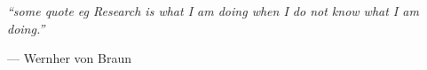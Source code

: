 \cleardoublepage
\thispagestyle{empty}
\vspace*{0.42\textheight}
\begin{flushright}
\small\itshape
``some quote eg Research is what I am doing when I do not know what I am doing.''\par
\vspace{0.55em}
\normalfont\scriptsize --- Wernher von Braun
\end{flushright}
